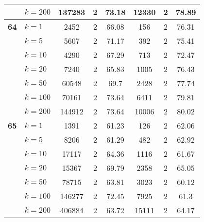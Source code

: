 \begin{table}[htbp]
\begin{tabular}{|l|l|c|c|c|c|c|c|}
     & $k=200$ & 137283 & 2 & 73.18 & 12330 & 2 & 78.89 \\ \hline
    \multicolumn{1}{|r|}{\textbf{64}} & $k=1$ & 2452 & 2 & 66.08 & 156 & 2 & 76.31 \\ 
     & $k=5$ & 5607 & 2 & 71.17 & 392 & 2 & 75.41 \\ 
     & $k=10$ & 4290 & 2 & 67.29 & 713 & 2 & 72.47 \\ 
     & $k=20$ & 7240 & 2 & 65.83 & 1005 & 2 & 76.43 \\ 
     & $k=50$ & 60548 & 2 & 69.7 & 2428 & 2 & 77.74 \\ 
     & $k=100$ & 70161 & 2 & 73.64 & 6411 & 2 & 79.81 \\ 
     & $k=200$ & 144912 & 2 & 73.64 & 10006 & 2 & 80.02 \\ \hline
    \multicolumn{1}{|r|}{\textbf{65}} & $k=1$ & 1391 & 2 & 61.23 & 126 & 2 & 62.06 \\ 
     & $k=5$ & 8206 & 2 & 61.29 & 482 & 2 & 62.92 \\ 
     & $k=10$ & 17117 & 2 & 64.36 & 1116 & 2 & 61.67 \\ 
     & $k=20$ & 15367 & 2 & 69.79 & 2358 & 2 & 65.05 \\ 
     & $k=50$ & 78715 & 2 & 63.81 & 3023 & 2 & 60.12 \\ 
     & $k=100$ & 146277 & 2 & 72.45 & 7925 & 2 & 61.3 \\ 
     & $k=200$ & 406884 & 2 & 63.72 & 15111 & 2 & 64.17 \\ \hline
    \end{tabular}
\end{table}
